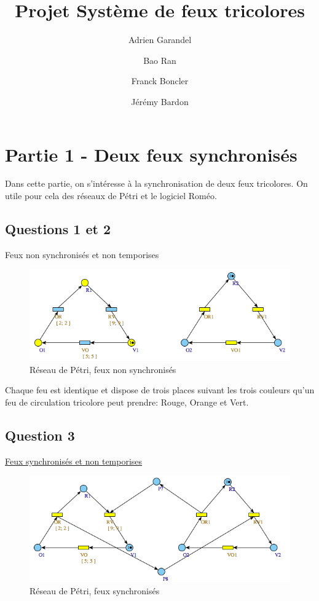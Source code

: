 \documentclass[11pt]{article}
\title{Projet Système de feux tricolores}
\author{Adrien Garandel \and Bao Ran \and Franck Boncler \and Jérémy Bardon}
\begin{document}
\maketitle
\tableofcontents
\newpage

\section{Partie 1 - Deux feux synchronisés}
Dans cette partie, on s'intéresse à la synchronisation de deux feux tricolores. On utile pour cela des réseaux de Pétri et le logiciel Roméo.

\subsection{Questions 1 et 2}
Feux non synchronisés et non temporises

\begin{figure}[H]
	\centering
	\includegraphics[width=1\textwidth]{ressources/part1/Q2.png}
	\caption{Réseau de Pétri, feux non synchronisés}
\end{figure}

Chaque feu est identique et dispose de trois places suivant les trois couleurs qu'un feu de circulation tricolore peut prendre: Rouge, Orange et Vert.

\subsection{Question 3}

\href{https://github.com/masters-info-nantes/hong-cheng-lv/blob/master/ressources/part1/Q3-FeuxSynchro.xml}{Feux
synchronisés et non temporises}

\begin{figure}[H]
	\centering
	\includegraphics[width=1\textwidth]{ressources/part1/Q3.png}
	\caption{Réseau de Pétri, feux synchronisés}
\end{figure}
\end{document}

